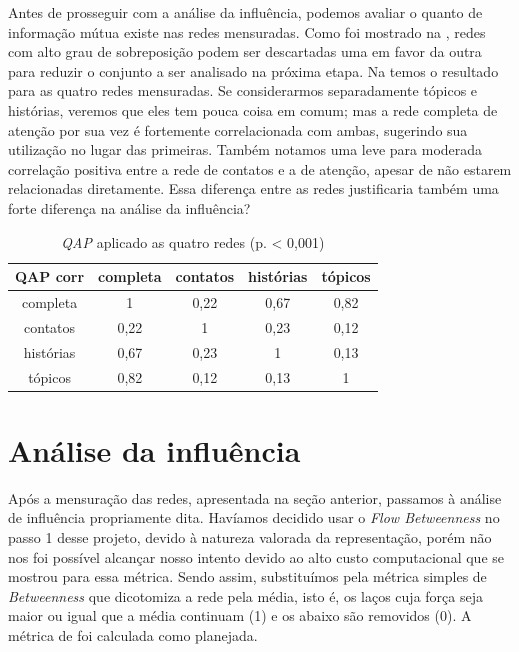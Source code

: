 Antes de prosseguir com a análise da influência, podemos avaliar o quanto de
informação mútua existe nas redes mensuradas. Como foi mostrado na
, redes com alto grau de sobreposição podem ser
descartadas uma em favor da outra para reduzir o conjunto a ser analisado na
próxima etapa. Na  temos o resultado para as quatro redes
mensuradas. Se considerarmos separadamente tópicos e histórias, veremos que eles
tem pouca coisa em comum; mas a rede completa de atenção por sua vez é
fortemente correlacionada com ambas, sugerindo sua utilização no lugar das
primeiras. Também notamos uma leve para moderada correlação positiva entre a
rede de contatos e a de atenção, apesar de não estarem relacionadas diretamente.
Essa diferença entre as redes justificaria também uma forte diferença na análise
da influência?

\begin{table}[htbp]
	\large
	\setlength{\arrayrulewidth}{2\arrayrulewidth}
	\setlength{\belowcaptionskip}{10pt}
	\caption{\emph{QAP} aplicado as quatro redes (p. < 0,001)} \centering
	\begin{tabular}{|c | c  c  c  c |}
	\hline
	QAP corr & completa & contatos & histórias & tópicos \\ \hline
	completa & 1 & 0,22 & 0,67 & 0,82 \\
	contatos & 0,22 & 1 & 0,23 & 0,12 \\
	histórias & 0,67 & 0,23 & 1 & 0,13 \\
	tópicos	& 0,82 & 0,12 & 0,13 & 1 \\ \hline
	\end{tabular}
	\label{ap:tab:qap}
\end{table}


\section{Análise da influência}
\label{ap:sec:analise}

Após a mensuração das redes, apresentada na seção anterior, passamos à análise
de influência propriamente dita. Havíamos decidido usar o \emph{Flow
Betweenness} no passo 1 desse projeto, devido à natureza valorada da
representação, porém não nos foi possível alcançar nosso intento devido ao alto
custo computacional que se mostrou para essa métrica. Sendo assim, substituímos
pela métrica simples de \emph{Betweenness} que dicotomiza a rede pela média,
isto é, os laços cuja força seja maior ou igual que a média continuam (1) e os
abaixo são removidos (0). A métrica de \citeauthor{Bonacich1987} foi calculada
como planejada.


